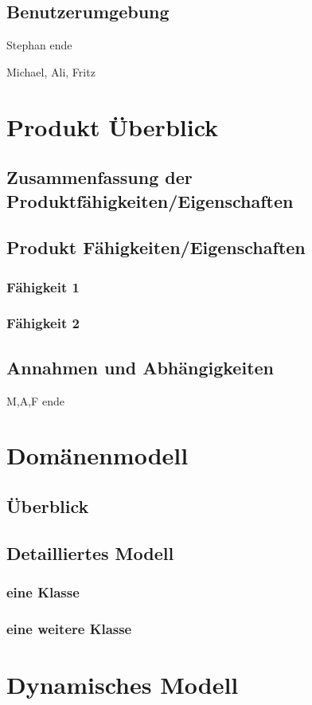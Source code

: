 \documentclass{article}
\begin{document}
\subsection{Benutzerumgebung}
Stephan ende

Michael, Ali, Fritz
\section{Produkt Überblick}
\subsection{Zusammenfassung der Produktfähigkeiten/Eigenschaften}
\subsection{Produkt Fähigkeiten/Eigenschaften}
\subsubsection{Fähigkeit 1}
\subsubsection{Fähigkeit 2}
\subsection{Annahmen und Abhängigkeiten}
M,A,F ende

\section{Domänenmodell}
\subsection{Überblick}
\subsection{Detailliertes Modell}
\subsubsection{eine Klasse}
\subsubsection{eine weitere Klasse}

\section{Dynamisches Modell}
\end{document}
